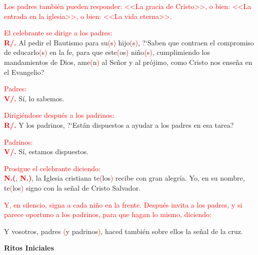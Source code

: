 \documentclass[12pt, letterpaper, spanish]{article}
\begin{document}
  \large {\textcolor{red}{Los padres tambi\'en pueden responder: <<La gracia de Cristo>>, o bien: <<La entrada en la iglesia>>, o bien: <<La vida eterna>>.}}

  \large {\textcolor{red}{El celebrante se dirige a los padres:}}\\
  \Large {\bfseries \textcolor{red}{R/.}} \hspace{1cm} \Large {Al pedir el Bautismo para su\textcolor{red}{(}s\textcolor{red}{)} hijo\textcolor{red}{(}s\textcolor{red}{)}, ?`Saben que contraen el compromiso de educarlo\textcolor{red}{(}s\textcolor{red}{)} en la fe, para que este\textcolor{red}{(}os\textcolor{red}{)} ni\~no\textcolor{red}{(}s\textcolor{red}{)}, cumplimiendo los mandamientos de Dios, ame\textcolor{red}{(}n\textcolor{red}{)} al Se\~nor y al pr\'ojimo, como Cristo nos ense\~na en el Evangelio?}

  \large {\textcolor{red}{Padres:}}\\
  \Large {\bfseries \textcolor{red}{V/.}} \hspace{1cm} S\'i, lo sabemos.

  \large {\textcolor{red}{Dirigi\'endose despu\'es a los padrinos:}}\\
  \Large {\bfseries \textcolor{red}{R/.}} \hspace{1cm} Y los padrinos, ?`Est\'an dispuestos a ayudar a los padres en esa tarea?

  \large {\textcolor{red}{Padrinos:}}\\
  \Large {\bfseries \textcolor{red}{V/.}} \hspace{1cm} S\'i, estamos dispuestos.

  \large {\textcolor{red}{Prosigue el celebrante diciendo:}} \\
  \noindent
  \Large {\bfseries \textcolor{red}{N.(}}, \Large {\bfseries \textcolor{red}{N.)}}, \Large {la Iglesia cristiana te\textcolor{red}{(}los\textcolor{red}{)} recibe con gran alegr\'ia. Yo, en su nombre, te\textcolor{red}{(}los\textcolor{red}{)} signo con la se\~nal de Cristo Salvador.}

  \large {\textcolor{red}{Y, en silencio, signa a cada ni\~no en la frente. Despu\'es invita a los padres, y si parece oportuno a los padrinos, para que hagan lo mismo, diciendo:}} 

  \noindent
  \Large {Y vosotros, padres \textcolor{red}{(}y padrinos\textcolor{red}{)}, haced tambi\'en sobre ellos la se\~nal de la cruz.}

  \clearpage
  
  \begin{center}
    \Huge {\bfseries Ritos Iniciales}
  \end{center}
\end{document}
